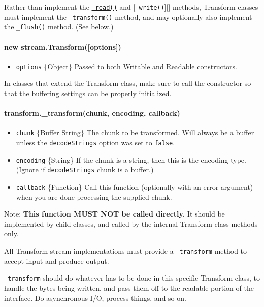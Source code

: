Rather than implement the
\hyperref[stream\_readable\_read\_size\_1]{\texttt{\_read()}} and
{[}\texttt{\_write()}{]}{[}{]} methods, Transform classes must implement
the \texttt{\_transform()} method, and may optionally also implement the
\texttt{\_flush()} method. (See below.)

\paragraph{new stream.Transform({[}options{]})}

\begin{itemize}
\item
  \texttt{options} \{Object\} Passed to both Writable and Readable
  constructors.
\end{itemize}

In classes that extend the Transform class, make sure to call the
constructor so that the buffering settings can be properly initialized.

\paragraph{transform.\_transform(chunk, encoding, callback)}

\begin{itemize}
\item
  \texttt{chunk} \{Buffer \textbar{} String\} The chunk to be
  transformed. Will always be a buffer unless the \texttt{decodeStrings}
  option was set to \texttt{false}.
\item
  \texttt{encoding} \{String\} If the chunk is a string, then this is
  the encoding type. (Ignore if \texttt{decodeStrings} chunk is a
  buffer.)
\item
  \texttt{callback} \{Function\} Call this function (optionally with an
  error argument) when you are done processing the supplied chunk.
\end{itemize}

Note: \textbf{This function MUST NOT be called directly.} It should be
implemented by child classes, and called by the internal Transform class
methods only.

All Transform stream implementations must provide a \texttt{\_transform}
method to accept input and produce output.

\texttt{\_transform} should do whatever has to be done in this specific
Transform class, to handle the bytes being written, and pass them off to
the readable portion of the interface. Do asynchronous I/O, process
things, and so on.

